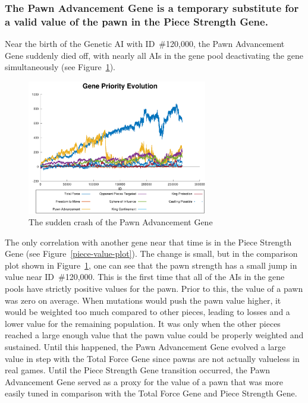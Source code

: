\documentclass[letterpaper]{article}
\renewcommand{\_}{\allowbreak\textunderscore\allowbreak}
\begin{document}
\subsubsection{The Pawn Advancement Gene is a temporary substitute for a valid value of the pawn in the Piece Strength Gene.}\label{pawn-result}

Near the birth of the Genetic AI with ID~\#120,000, the Pawn Advancement Gene suddenly died off, with nearly all AIs in the gene pool deactivating the gene simultaneously (see Figure~\ref{pawn-crash}).
\begin{figure}[htb]
	\centering
	\includegraphics[width=0.7\textwidth]{pawn-advancement-crash}
	\caption{The sudden crash of the Pawn Advancement Gene}\label{pawn-crash}
\end{figure}

The only correlation with another gene near that time is in the Piece Strength Gene (see Figure~\ref{piece-value-plot}). The change is small, but in the comparison plot shown in Figure~\ref{pawn-crash}, one can see that the pawn strength has a small jump in value near ID~\#120,000. This is the first time that all of the AIs in the gene pools have strictly positive values for the pawn. Prior to this, the value of a pawn was zero on average. When mutations would push the pawn value higher, it would be weighted too much compared to other pieces, leading to losses and a lower value for the remaining population. It was only when the other pieces reached a large enough value that the pawn value could be properly weighted and sustained. Until this happened, the Pawn Advancement Gene evolved a large value in step with the Total Force Gene since pawns are not actually valueless in real games. Until the Piece Strength Gene transition occurred, the Pawn Advancement Gene served as a proxy for the value of a pawn that was more easily tuned in comparison with the Total Force Gene and Piece Strength Gene.
\end{document}
